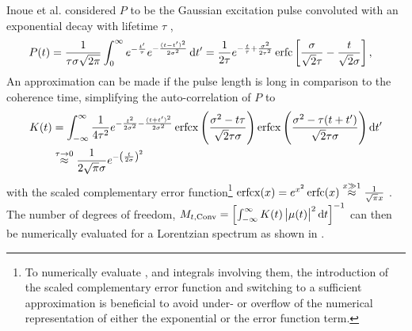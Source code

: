 Inoue et al. considered $P$ to be the Gaussian excitation pulse convoluted with an exponential decay with lifetime $\tau$ \cite{inoue2019,butz2015},
\begin{align}
P(t)&=\frac{1}{\tau\sigma\sqrt{2\pi}} \int_0^{\infty} e^{-\frac{t^{\prime}}{\tau}} 
e^{-\frac{(t-t^{\prime})^2}{2\sigma^2}}\operatorname{\mathrm{d}\!} t^{\prime}
=\frac{1}{2\tau}e^{-\frac{t}{\tau}+\frac{\sigma^2}{2\tau^2}}
\operatorname{erfc}\left[
\frac{\sigma}{\sqrt{2}\tau}
-\frac{t}{\sqrt{2}\sigma}
	\right] ,
	\label{eq:pfull}
	\end{align}
	An approximation can be made if the pulse length is long in comparison to the coherence time, simplifying the auto-correlation of $P$ to
\begin{align}
K(t)&=\int_{-\infty}^\infty \frac{1}{4
	\tau ^2}e^{-\frac{t^2}{2 \sigma ^2}-\frac{(t+t')^2}{2 \sigma ^2}}
\operatorname{erfcx}\left(\frac{\sigma^2 -t \tau }{\sqrt{2} \tau \sigma}\right)
\operatorname{erfcx}\left(\frac{\sigma^2 -\tau  (t+t')}{\sqrt{2} \tau \sigma }\right) \operatorname{\mathrm{d}\!} t' \nonumber \\
&\stackrel{\tau \rightarrow 0}{\approx} \frac{1}{2\sqrt{\pi}\sigma} e^{-\left(\frac{t}{2\sigma}\right)^2} 
\label{eq:kapprox}
\end{align}
with the scaled complementary error function\footnote{To numerically evaluate ,  and integrals involving them, the introduction of the scaled complementary error function and switching to a sufficient approximation is beneficial to avoid under- or overflow of the numerical representation of either the exponential or the error function term.} $\operatorname{erfcx}(x)=e^{x^2}\operatorname{erfc}(x)\stackrel{x\gg1}{\approx}  \frac{1}{\sqrt{\pi}x}$
   \cite{ren2007}.
The number of degrees of freedom, $M_{t,\text{Conv}}=\left[\int_{-\infty}^{\infty} K(t) \left|\mu(t)\right|^2\operatorname{\mathrm{d}\!} t\right]^{-1}$  can then be numerically evaluated   for a Lorentzian spectrum as shown in .

